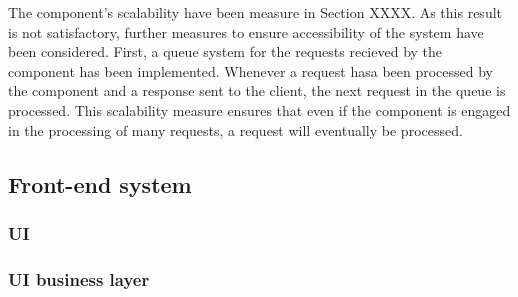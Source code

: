 The component's scalability have been measure in Section XXXX. As this result is not satisfactory, further measures to ensure accessibility of the system have been considered. 
First, a queue system for the requests recieved by the component has been implemented. 
Whenever a request hasa been processed by the component and a response sent to the client, the next request in the queue is processed. 
This scalability measure ensures that even if the component is engaged in the processing of many requests, a request will eventually be processed.

\subsection{Front-end system}

\subsubsection{UI}

\subsubsection{UI business layer}